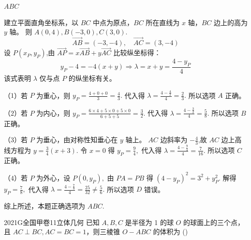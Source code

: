 \documentclass[12pt,UTF-8,a4paper]{ctexart}
\numberwithin{figure}{section}
\theoremstyle{mystyle}
\theoremstyle{mystylekaishu}
\theoremstyle{mystyle}
\numberwithin{xiti}{section}
\begin{document}
\begin{answer}
$ABC$
\end{answer}

\begin{solutions}
建立平面直角坐标系，以 $BC$ 中点为原点，$BC$ 所在直线为 $x$ 轴，$BC$ 边上的高为 $y$ 轴。
则 $A(0,4), B(-3,0), C(3,0)$.
$$
\overrightarrow{AB}=(-3,-4), \quad \overrightarrow{AC}=(3,-4)
$$
设 $P(x_P,y_P)$,由 $\overrightarrow{AP}=x \overrightarrow{AB}+y \overrightarrow{AC}$ 比较纵坐标得：
$$
y_P-4=-4(x+y) \Rightarrow \lambda=x+y=\frac{4-y_P}{4}
$$
该式表明 $\lambda$ 仅与点 $P$ 的纵坐标有关。

（$1$）若 $P$ 为重心，则 $y_P=\displaystyle\frac{4+0+0}{3}=\displaystyle\frac{4}{3}.$
代入得 $\lambda=\displaystyle\frac{4-\frac{4}{3}}{4}=\displaystyle\frac{2}{3}.$ 所以选项 $A$ 正确。

（$2$）若 $P$ 为内心，则 $y_P=\displaystyle\frac{6\times 4+5\times 0+5\times 0}{6+5+5}=\displaystyle\frac{3}{2}.$
代入得 $\lambda=\displaystyle\frac{4-\frac{3}{2}}{4}=\displaystyle\frac{5}{8}.$ 所以选项 $B$ 正确。

（$3$）若 $P$ 为垂心，由对称性知垂心在 $y$ 轴上。
$AC$ 边斜率为 $-\displaystyle\frac{4}{3}$,故 $AC$ 边上高线方程为 $y=\displaystyle\frac{3}{4}(x+3).$
令 $x=0$ 得 $y_P=\displaystyle\frac{9}{4},$ 代入得 $\lambda=\displaystyle\frac{4-\frac{9}{4}}{4}=\displaystyle\frac{7}{16}.$ 所以选项 $C$ 正确。

（$4$）若 $P$ 为外心，设 $P(0,y_P),$ 由 $PA=PB$ 得 $(4-y_P)^2=3^2+y_P^2.$
解得 $y_P=\displaystyle\frac{7}{8},$ 代入得 $\lambda=\displaystyle\frac{4-\frac{7}{8}}{4}=\displaystyle\frac{25}{32}\neq\displaystyle\frac{5}{6}.$ 所以选项 $D$ 错误。

综上所述，本题正确选项为 $ABC.$ 
\end{solutions}


\begin{problem}{2021}{G}{全国甲卷}{11}{立体几何}
已知 $A, B, C$ 是半径为 1 的球 $O$ 的球面上的三个点，且 $AC \perp BC, AC=BC=1$，则三棱锥 $O-ABC$ 的体积为 (\hspace{1cm})
\begin{choices}
\end{choices}
\end{problem}
\end{document}
